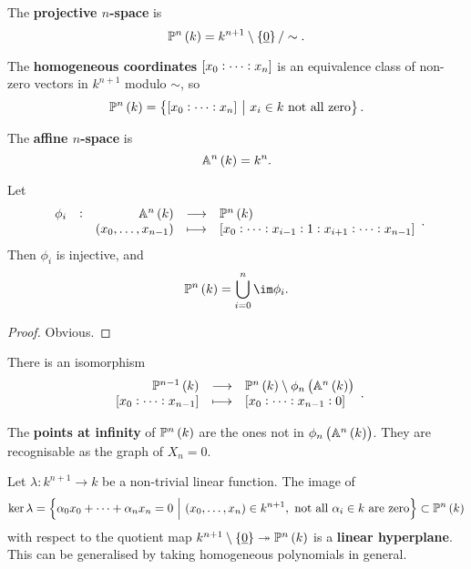 \begin{definition}
The \textbf{projective $ n $-space} is
$$ \PP^n\br{k} = k^{n + 1} \setminus \cbr{\underline{0}} / \sim. $$
\end{definition}

\begin{notation}
The \textbf{homogeneous coordinates} $ \sbr{x_0 : \dots : x_n} $ is an equivalence class of non-zero vectors in $ k^{n + 1} $ modulo $ \sim $, so
$$ \PP^n\br{k} = \cbr{\sbr{x_0 : \dots : x_n} \st x_i \in k \ \text{not all zero}}. $$
\end{notation}

\pagebreak

\begin{definition}
The \textbf{affine $ n $-space} is
$$ \AA^n\br{k} = k^n. $$
\end{definition}

\begin{lemma}
Let
$$ \function[\phi_i]{\AA^n\br{k}}{\PP^n\br{k}}{\br{x_0, \dots, x_{n - 1}}}{\sbr{x_0 : \dots : x_{i - 1} : 1 : x_{i + 1} : \dots : x_{n - 1}}}. $$
Then $ \phi_i $ is injective, and
$$ \PP^n\br{k} = \bigcup_{i = 0}^n \im \phi_i. $$
\end{lemma}

\begin{proof}
Obvious.
\end{proof}

\begin{exercise}
There is an isomorphism
$$ \function{\PP^{n - 1}\br{k}}{\PP^n\br{k} \setminus \phi_n\br{\AA^n\br{k}}}{\sbr{x_0 : \dots : x_{n - 1}}}{\sbr{x_0 : \dots : x_{n - 1} : 0}}. $$
\end{exercise}

\begin{definition}
The \textbf{points at infinity} of $ \PP^n\br{k} $ are the ones not in $ \phi_n\br{\AA^n\br{k}} $. They are recognisable as the graph of $ X_n = 0 $.
\end{definition}


Let $ \lambda : k^{n + 1} \to k $ be a non-trivial linear function. The image of
$$ \ker \lambda = \cbr{\alpha_0x_0 + \dots + \alpha_nx_n = 0 \st \br{x_0, \dots, x_n} \in k^{n + 1}, \ \text{not all} \ \alpha_i \in k \ \text{are zero}} \subset \PP^n\br{k} $$
with respect to the quotient map $ k^{n + 1} \setminus \cbr{\underline{0}} \twoheadrightarrow \PP^n\br{k} $ is a \textbf{linear hyperplane}. This can be generalised by taking homogeneous polynomials in general.

